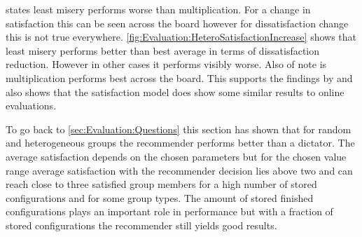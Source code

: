  states least misery performs worse than multiplication. For a change in satisfaction this can be seen across the board however for dissatisfaction change this is not true everywhere. \autoref{fig:Evaluation:HeteroSatisfactionIncrease} shows that least misery performs better than best average in terms of dissatisfaction reduction. However in other cases it performs visibly worse. Also of note is multiplication performs best across the board. This supports the findings by \citeauthor{Masthoff2015} \cite[p. 755f]{Masthoff2015} and also shows that the satisfaction model does show some similar results to online evaluations.


To go back to \autoref{sec:Evaluation:Questions} this section has shown that for random and heterogeneous groups the recommender performs better than a dictator. The average satisfaction depends on the chosen parameters but for the chosen value range average satisfaction with the recommender decision lies above two and can reach close to three satisfied group members for a high number of stored configurations and for some group types. The amount of stored finished configurations plays an important role in performance but with a fraction of stored configurations the recommender still yields good results.

